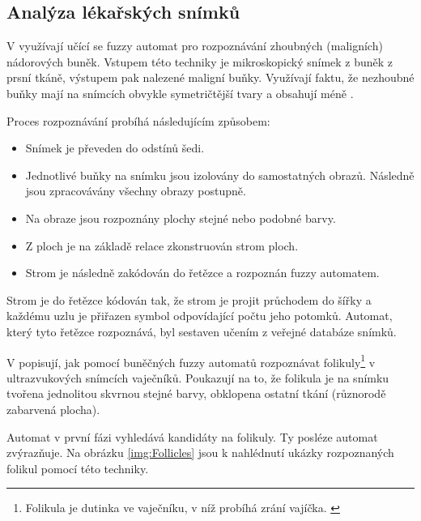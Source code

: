 \subsection{Analýza lékařských snímků} \label{subs:MedImgs}
V \cite{Est+-CytImAnaGenFuFiStMa} využívají učící se fuzzy automat pro rozpoznávání zhoubných (maligních) nádorových buněk. Vstupem této techniky je mikroskopický snímek z buněk z prsní tkáně, výstupem pak nalezené maligní buňky. Využívají faktu, že nezhoubné buňky mají na snímcích obvykle symetričtější tvary a obsahují méně .

Proces rozpoznávání probíhá následujícím způsobem:
\begin{itemize}
 \item Snímek je převeden do odstínů šedi.
 \item Jednotlivé buňky na snímku jsou izolovány do samostatných obrazů. Následně jsou zpracovávány všechny obrazy postupně.
 \item Na obraze jsou rozpoznány plochy stejné nebo podobné barvy.
 \item Z ploch je na základě relace  zkonstruován strom ploch.
 \item Strom je následně zakódován do řetězce a rozpoznán fuzzy automatem.
\end{itemize}

Strom je do řetězce kódován tak, že strom je projit průchodem do šířky a každému uzlu je přiřazen symbol odpovídající počtu jeho potomků. Automat, který tyto řetězce rozpoznává, byl sestaven učením z veřejné databáze snímků.

V \cite{WanJiaZhoDu-ImProcBasFuzCelAuMod} popisují, jak pomocí buněčných fuzzy automatů rozpoznávat folikuly\footnote{Folikula je dutinka ve vaječníku, v níž probíhá zrání vajíčka. \cite{web-Folikul}} v ultrazvukových snímcích vaječníků. Poukazují na to, že folikula je na snímku tvořena jednolitou skvrnou stejné barvy, obklopena ostatní tkání (různorodě zabarvená plocha).

Automat v první fázi vyhledává kandidáty na folikuly. Ty posléze automat zvýrazňuje. Na obrázku \ref{img:Follicles} jsou k nahlédnutí ukázky rozpoznaných folikul pomocí této techniky.

